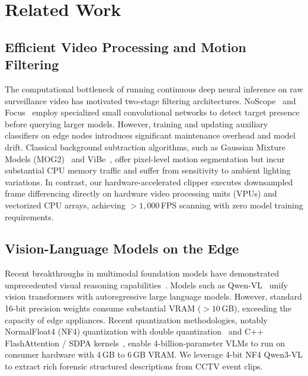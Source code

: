 \documentclass[10pt, conference]{IEEEtran}
\begin{document}
\section{Related Work}
\label{sec:related}

\subsection{Efficient Video Processing and Motion Filtering}
The computational bottleneck of running continuous deep neural inference on raw surveillance video has motivated two-stage filtering architectures. NoScope~\cite{kang2017noscope} and Focus~\cite{hsieh2019focus} employ specialized small convolutional networks to detect target presence before querying larger models. However, training and updating auxiliary classifiers on edge nodes introduces significant maintenance overhead and model drift. Classical background subtraction algorithms, such as Gaussian Mixture Models (MOG2)~\cite{zivkovic2006efficient} and ViBe~\cite{barnich2011vibe}, offer pixel-level motion segmentation but incur substantial CPU memory traffic and suffer from sensitivity to ambient lighting variations. In contrast, our hardware-accelerated clipper executes downsampled frame differencing directly on hardware video processing units (VPUs) and vectorized CPU arrays, achieving $>1,000$\,FPS scanning with zero model training requirements.

\subsection{Vision-Language Models on the Edge}
Recent breakthroughs in multimodal foundation models have demonstrated unprecedented visual reasoning capabilities~\cite{radford2021learning, vaswani2017attention}. Models such as Qwen-VL~\cite{bai2023qwen} unify vision transformers with autoregressive large language models. However, standard 16-bit precision weights consume substantial VRAM ($>10$\,GB), exceeding the capacity of edge appliances. Recent quantization methodologies, notably NormalFloat4 (NF4) quantization with double quantization~\cite{dettmers2023qlora} and C++ FlashAttention / SDPA kernels~\cite{dao2022flashattention}, enable 4-billion-parameter VLMs to run on consumer hardware with 4\,GB to 6\,GB VRAM. We leverage 4-bit NF4 Qwen3-VL to extract rich forensic structured descriptions from CCTV event clips.
\end{document}
